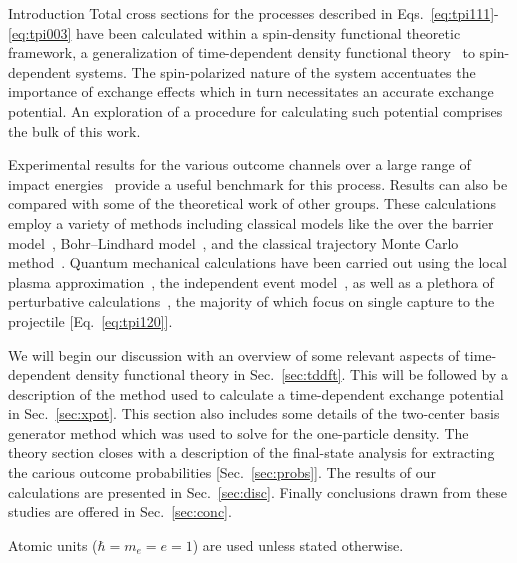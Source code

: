 \documentclass[aps, pra, reprint, groupedaddress, amsfonts,
               amsmath, amssymb, showpacs, nofootinbib]{revtex4-1}
\begin{document}
\begin{section}{Introduction \label{sec:intro}}
   Total cross sections for the processes described in Eqs.~\eqref{eq:tpi111}-\eqref{eq:tpi003} have
   been calculated within a spin-density functional theoretic~\cite{td-spindep} framework, a
   generalization of time-dependent density functional theory~\cite{tddft, ullrich} to spin-dependent
   systems. The spin-polarized nature of the system accentuates the importance of exchange effects
   which in turn necessitates an accurate exchange potential. An exploration of a procedure for
   calculating such potential comprises the bulk of this work.

   Experimental results for the various outcome channels over a large range of impact
   energies~\cite{BS58, HN78, HSE78, dCFdP88, DT-88, Dub-89, ASL91, FTFHLP-95, SSMSM-11} provide a
   useful benchmark for this process. Results can also be compared with some of the theoretical work of
   other groups. These calculations employ a variety of methods including classical models like the
   over the barrier model~\cite{CC-07}, Bohr–Lindhard model~\cite{DYC-08, DLZ-12}, and the classical
   trajectory Monte Carlo method~\cite{GMZ17}. Quantum mechanical calculations have been carried out
   using the local plasma approximation~\cite{MMA03}, the independent event model~\cite{SM-03}, as well
   as a plethora of perturbative calculations~\cite{Mancev96, BOC05, Mancev-07, MG-10, NTC11, GG-12b,
   GAG15}, the majority of which focus on single capture to the projectile [Eq.~\eqref{eq:tpi120}].

   We will begin our discussion with an overview of some relevant aspects of time-dependent density
   functional theory in Sec.~\ref{sec:tddft}. This will be followed by a description of the method used
   to calculate a time-dependent exchange potential in Sec.~\ref{sec:xpot}. This section also includes
   some details of the two-center basis generator method which was used to solve for the one-particle
   density. The theory section closes with a description of the final-state analysis for extracting
   the carious outcome probabilities [Sec.~\ref{sec:probs}]. The results of our calculations are
   presented in Sec.~\ref{sec:disc}. Finally conclusions drawn from these studies are offered in
   Sec.~\ref{sec:conc}.

   Atomic units ($\hbar = m_e = e = 1$) are used unless stated otherwise.

\end{section}
\end{document}
